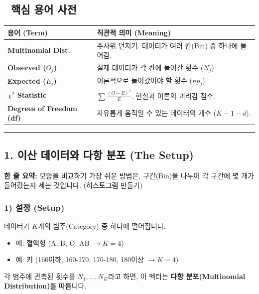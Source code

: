 \documentclass[11pt,a4paper]{book}
\theoremstyle{definition}
\begin{document}
\subsection*{📝 핵심 용어 사전}
\begin{table}[h]
\centering
\begin{tabularx}{\textwidth}{|p{}|X|}
\hline
\textbf{용어 (Term)} & \textbf{직관적 의미 (Meaning)} \\
\hline
\textbf{Multinomial Dist.} & 주사위 던지기. 데이터가 여러 칸(Bin) 중 하나에 들어감. \\
\hline
\textbf{Observed ($O_j$)} & 실제 데이터가 각 칸에 들어간 횟수 ($N_j$). \\
\hline
\textbf{Expected ($E_j$)} & 이론적으로 들어갔어야 할 횟수 ($n p_j$). \\
\hline
\textbf{$\chi^2$ Statistic} & $\sum \frac{(O-E)^2}{E}$. 현실과 이론의 괴리감 점수. \\
\hline
\textbf{Degrees of Freedom (df)} & 자유롭게 움직일 수 있는 데이터의 개수 ($K-1-d$). \\
\hline
\end{tabularx}
\end{table}

\vspace{0.5cm}\hrule\vspace{0.5cm}

\subsection{1. 이산 데이터와 다항 분포 (The Setup)}

\begin{conceptbox}[title={개념 1: 연속을 이산으로 (Discretization)}]
\textbf{한 줄 요약:} 모양을 비교하기 가장 쉬운 방법은, 구간(Bin)을 나누어 각 구간에 몇 개가 들어갔는지 세는 것입니다. (히스토그램 만들기)
\end{conceptbox}


\subsubsection*{1) 설정 (Setup)}
데이터가 $K$개의 범주(Category) 중 하나에 떨어집니다.
\begin{itemize}
    \item 예: 혈액형 (A, B, O, AB $\rightarrow K=4$)
    \item 예: 키 (160이하, 160-170, 170-180, 180이상 $\rightarrow K=4$)
\end{itemize}
각 범주에 관측된 횟수를 $N_1, ..., N_K$라고 하면, 이 벡터는 \textbf{다항 분포(Multinomial Distribution)}를 따릅니다.
\end{document}
